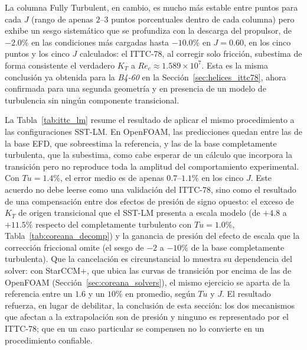 La columna Fully Turbulent, en cambio, es mucho más estable entre puntos para cada $J$
(rango de apenas $2$--$3$ puntos porcentuales dentro de cada columna) pero exhibe un
sesgo sistemático que se profundiza con la descarga del propulsor, de $-2.0\%$ en las
condiciones más cargadas hasta $-10.0\%$ en $J=0.60$, en los cinco puntos y los cinco
$J$ calculados: el ITTC-78, al corregir solo fricción, subestima de forma consistente
el verdadero $K_T$ a $Re_c \approx 1.589\times10^7$. Esta es
la misma conclusión ya obtenida para la \textit{B4-60} en la Sección~\ref{sec:helices_ittc78},
ahora confirmada para una segunda geometría y en presencia de un modelo de turbulencia
sin ningún componente transicional.

La Tabla~\ref{tab:ittc_lm} resume el resultado de aplicar el mismo procedimiento a las
configuraciones SST-LM. En OpenFOAM, las predicciones quedan entre las de la base EFD,
que sobreestima la referencia, y las de la base completamente turbulenta, que la
subestima, como cabe esperar de un cálculo que incorpora la transición pero no reproduce
toda la amplitud del comportamiento experimental. Con $Tu=1.4\%$, el error medio es de
apenas $0.7$--$1.1\%$ en los cinco $J$. Este acuerdo no debe leerse como una validación
del ITTC-78, sino como el resultado de una compensación entre dos efectos de presión de
signo opuesto: el exceso de $K_T$ de origen transicional que el SST-LM presenta a escala
modelo (de $+4.8$ a $+11.5\%$ respecto del completamente turbulento con $Tu=1.0\%$,
Tabla~\ref{tab:coreana_decomp}) y la ganancia de presión del efecto de escala que la
corrección friccional omite (el sesgo de $-2$ a $-10\%$ de la base completamente
turbulenta). Que la cancelación es circunstancial lo muestra su dependencia del solver:
con StarCCM+, que ubica las curvas de transición por encima de las de OpenFOAM
(Sección~\ref{sec:coreana_solvers}), el mismo ejercicio se aparta de la referencia entre
un $1.6$ y un $10\%$ en promedio, según $Tu$ y $J$. El resultado refuerza, en lugar de
debilitar, la conclusión de esta sección: los dos mecanismos que afectan a la
extrapolación son de presión y ninguno es representado por el ITTC-78; que en un caso
particular se compensen no lo convierte en un procedimiento confiable.

